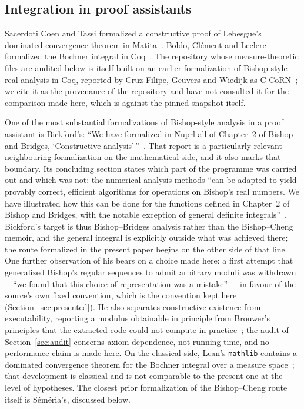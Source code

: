 \documentclass[11pt]{article}
\theoremstyle{definition}
\theoremstyle{remark}
\begin{document}
\subsection*{Integration in proof assistants}
Sacerdoti Coen and Tassi formalized a constructive proof of Lebesgue's dominated convergence theorem in Matita~\cite{sacerdoti-coen-tassi-2008}.  Boldo, Cl\'ement and Leclerc formalized the Bochner integral in Coq~\cite{boldo-clement-leclerc-2022}.  The repository whose measure-theoretic files are audited below is itself built on an earlier formalization of Bishop-style real analysis in Coq, reported by Cruz-Filipe, Geuvers and Wiedijk as C-CoRN~\cite{cruz-filipe-geuvers-wiedijk-2004}; we cite it as the provenance of the repository and have not consulted it for the comparison made here, which is against the pinned snapshot itself.

One of the most substantial formalizations of Bishop-style analysis in a proof assistant is Bickford's: ``We have formalized in Nuprl all of Chapter~2 of Bishop and Bridges, `Constructive analysis'\,''~\cite[\S28.1]{bickford-2023}.  That report is a particularly relevant neighbouring formalization on the mathematical side, and it also marks that boundary.  Its concluding section states which part of the programme was carried out and which was not: the numerical-analysis methods ``can be adapted to yield provably correct, efficient algorithms for operations on Bishop's real numbers.  We have illustrated how this can be done for the functions defined in Chapter~2 of Bishop and Bridges, with the notable exception of general definite integrals''~\cite[\S28.14]{bickford-2023}.  Bickford's target is thus Bishop--Bridges analysis rather than the Bishop--Cheng memoir, and the general integral is explicitly outside what was achieved there; the route formalized in the present paper begins on the other side of that line.  One further observation of his bears on a choice made here: a first attempt that generalized Bishop's regular sequences to admit arbitrary moduli was withdrawn---``we found that this choice of representation was a mistake''~\cite[\S28.2]{bickford-2023}---in favour of the source's own fixed convention, which is the convention kept here (Section~\ref{sec:presented}).  He also separates constructive existence from executability, reporting a modulus obtainable in principle from Brouwer's principles that the extracted code could not compute in practice~\cite[\S28.13]{bickford-2023}; the audit of Section~\ref{sec:audit} concerns axiom dependence, not running time, and no performance claim is made here.  On the classical side, Lean's \texttt{mathlib} contains a dominated convergence theorem for the Bochner integral over a measure space~\cite{mathlib-2020,mathlib-dct}; that development is classical and is not comparable to the present one at the level of hypotheses.  The closest prior formalization of the Bishop--Cheng route itself is S\'em\'eria's, discussed below.
\end{document}
